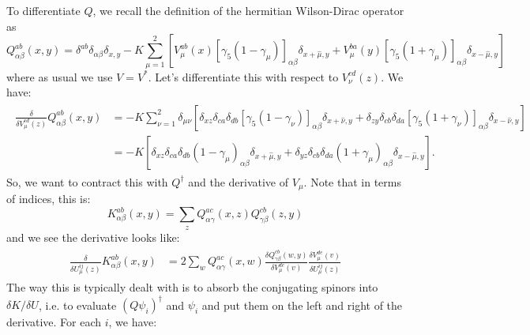 To differentiate $Q$, we recall the definition of the hermitian Wilson-Dirac operator as
\begin{equation}
	Q_{\alpha\beta}^{ab}(x, y) = \delta^{ab} \delta_{\alpha\beta} \delta_{x, y} - K \sum_{\mu = 1}^2 \left[ V_\mu^{ab}(x) [\gamma_5 (1 - \gamma_\mu)]_{\alpha\beta} \delta_{x + \hat\mu, y} + V_{\mu}^{ba}(y) [\gamma_5 (1 + \gamma_\mu)]_{\alpha\beta} \delta_{x - \hat\mu, y} \right]
\end{equation}
where as usual we use $V = V^*$. Let's differentiate this with respect to $V_\nu^{cd}(z)$. We have:
\begin{align}\begin{split}
	\frac{\delta}{\delta V_\mu^{cd}(z)} Q_{\alpha\beta}^{ab}(x, y) &= -K \sum_{\nu = 1}^2 \delta_{\mu\nu} \left[  \delta_{xz} \delta_{ca} \delta_{db} [\gamma_5(1 - \gamma_\nu)]_{\alpha\beta} \delta_{x+ \hat\nu, y} + \delta_{zy}\delta_{cb} \delta_{da} [\gamma_5(1 + \gamma_\nu)]_{\alpha\beta} \delta_{x - \hat\nu, y} \right] \\
	&= -K \left[ \delta_{xz}  \delta_{ca} \delta_{db} (1 - \gamma_\mu)_{\alpha\beta} \delta_{x  + \hat\mu, y} + \delta_{yz}  \delta_{cb} \delta_{da} (1 + \gamma_\mu)_{\alpha\beta} \delta_{x - \hat\mu, y} \right].
\end{split}\end{align}
So, we want to contract this with $Q^\dagger$ and the derivative of $V_\mu$. Note that in terms of indices, this is:
\begin{equation}
	K_{\alpha\beta}^{ab}(x, y) = \sum_z Q_{\alpha\gamma}^{ac}(x, z) Q_{\gamma\beta}^{cb}(z, y)
\end{equation}
and we see the derivative looks like:
\begin{align}\begin{split}
	\frac{\delta }{\delta U_\mu^{ij}(z)} K_{\alpha\beta}^{ab}(x, y) &= 2 \sum_w Q_{\alpha\gamma}^{ac}(x, w) \frac{\delta Q_{\gamma\beta}^{cb}(w, y) }{\delta V_\mu^{de}(v)} \frac{\delta V_\mu^{de}(v)}{\delta U_\mu^{ij}(z)}
\end{split}\end{align}
The way this is typically dealt with is to absorb the conjugating spinors into $\delta K / \delta U$, i.e. to evaluate $(Q \psi_i)^\dagger$ and $\psi_i$ and put them on the left and right of the derivative. For each $i$, we have:
